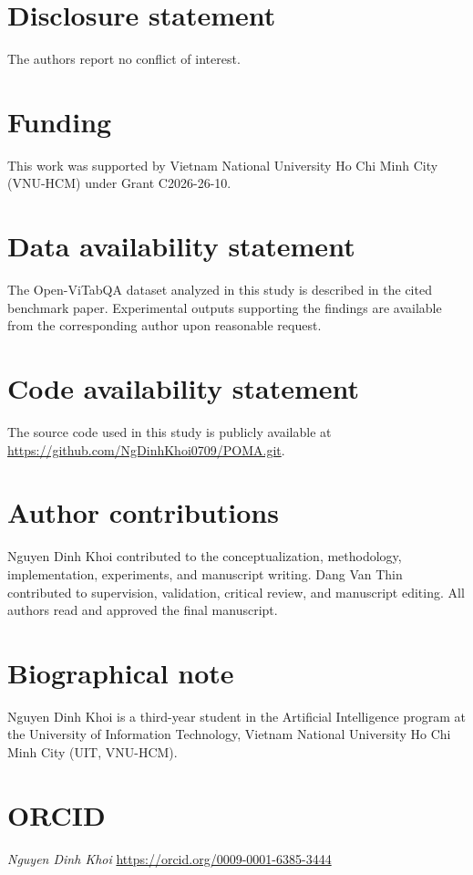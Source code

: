 \documentclass[]{interact}
\begin{document}
\section*{Disclosure statement}

The authors report no conflict of interest.

\section*{Funding}

This work was supported by Vietnam National University Ho Chi Minh City (VNU-HCM) under Grant C2026-26-10.

\section*{Data availability statement}

The Open-ViTabQA dataset analyzed in this study is described in the cited benchmark paper. Experimental outputs supporting the findings are available from the corresponding author upon reasonable request.

\section*{Code availability statement}

The source code used in this study is publicly available at \url{https://github.com/NgDinhKhoi0709/POMA.git}.

\section*{Author contributions}

Nguyen Dinh Khoi contributed to the conceptualization, methodology, implementation, experiments, and manuscript writing. Dang Van Thin contributed to supervision, validation, critical review, and manuscript editing. All authors read and approved the final manuscript.

\section*{Biographical note}

Nguyen Dinh Khoi is a third-year student in the Artificial Intelligence program at the University of Information Technology, Vietnam National University Ho Chi Minh City (UIT, VNU-HCM).

\section*{ORCID}

\textit{Nguyen Dinh Khoi} \url{https://orcid.org/0009-0001-6385-3444}

\printbibliography

\appendix

\end{document}
